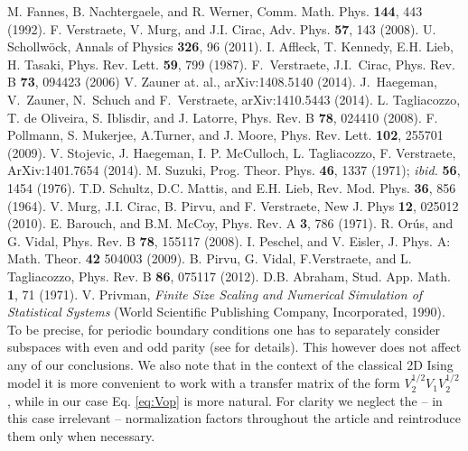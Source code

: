 \documentclass[prl,twocolumn,showpacs,floatfix,superscriptaddress,nofootinbib]{revtex4-1}
\begin{document}
\begin{thebibliography}{99}
 M. Fannes, B. Nachtergaele, and R. Werner, Comm. Math. Phys. {\bf 144}, 443 (1992).
 F. Verstraete, V. Murg, and J.I. Cirac, Adv. Phys. {\bf 57}, 143 (2008).
 U. Schollw\"ock, Annals of Physics {\bf 326}, 96 (2011).
  I. Affleck, T. Kennedy, E.H. Lieb, H. Tasaki,  Phys. Rev. Lett. {\bf 59}, 799 (1987).
 F.~Verstraete, J.I.~Cirac, Phys. Rev. B {\bf 73}, 094423 (2006)
 V. Zauner at. al., arXiv:1408.5140 (2014). 
 J.~Haegeman, V.~Zauner, N.~Schuch and F.~Verstraete, arXiv:1410.5443 (2014). 
 L. Tagliacozzo, T. de Oliveira, S. Iblisdir, and J. Latorre, Phys. Rev. B {\bf 78}, 024410 (2008).
 F. Pollmann, S. Mukerjee, A.Turner, and J. Moore, Phys. Rev. Lett. {\bf 102}, 255701 (2009).
 V. Stojevic, J. Haegeman, I. P. McCulloch,  L. Tagliacozzo, F. Verstraete,  ArXiv:1401.7654 (2014).
 M. Suzuki, Prog. Theor. Phys. {\bf 46}, 1337 (1971); {\it ibid. } {\bf 56}, 1454 (1976).
 T.D. Schultz, D.C. Mattis, and E.H. Lieb, Rev. Mod. Phys. {\bf 36}, 856 (1964).
 V. Murg, J.I. Cirac, B. Pirvu, and F. Verstraete, New J. Phys { \bf 12}, 025012 (2010).
 E. Barouch, and B.M. McCoy, Phys. Rev. A {\bf 3}, 786 (1971).
 R. Or\'us, and G. Vidal, Phys. Rev. B {\bf 78}, 155117 (2008).
 I. Peschel, and V. Eisler, J. Phys. A: Math. Theor. {\bf 42} 504003 (2009).
 B. Pirvu, G. Vidal, F.Verstraete, and L. Tagliacozzo, Phys. Rev. B {\bf 86}, 075117 (2012).
 D.B. Abraham, Stud. App. Math. {\bf 1}, 71 (1971).
 V. Privman, {\it Finite Size Scaling and Numerical Simulation of Statistical Systems} (World Scientific Publishing Company, Incorporated, 1990).
 {To be precise, for periodic boundary conditions one has to separately consider subspaces with even and odd parity (see \cite{RMP_LSM} for details). This however does not
affect any of our conclusions. We also note that in the context of the classical 2D Ising model \cite{RMP_LSM,Abraham1971} it is more convenient to work with a transfer matrix of the form $V_2^{1/2}V_1 V_2^{1/2}$,
while in our case Eq. \eqref{eq:Vop} is more natural. }
 {For clarity we neglect the -- in this case irrelevant  -- normalization factors throughout the article and reintroduce them only when necessary}.

\end{thebibliography}
\end{document}
